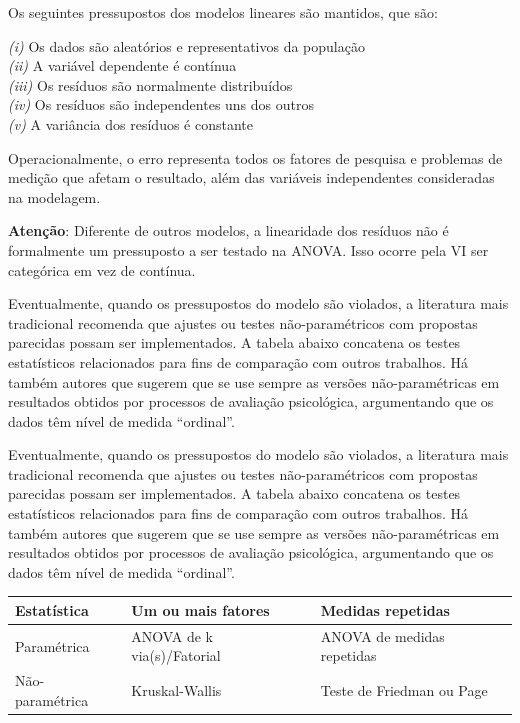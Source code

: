 \documentclass[
]{book}
\begin{document}
Os seguintes pressupostos dos modelos lineares são mantidos, que são:

\emph{(i)} Os dados são aleatórios e representativos da população\\
\emph{(ii)} A variável dependente é contínua\\
\emph{(iii)} Os resíduos são normalmente distribuídos\\
\emph{(iv)} Os resíduos são independentes uns dos outros\\
\emph{(v)} A variância dos resíduos é constante

Operacionalmente, o erro representa todos os fatores de pesquisa e problemas de medição que afetam o resultado, além das variáveis independentes consideradas na modelagem.

\textbf{Atenção}: Diferente de outros modelos, a linearidade dos resíduos não é formalmente um pressuposto a ser testado na ANOVA. Isso ocorre pela VI ser categórica em vez de contínua.

Eventualmente, quando os pressupostos do modelo são violados, a literatura mais tradicional recomenda que ajustes ou testes não-paramétricos com propostas parecidas possam ser implementados. A tabela abaixo concatena os testes estatísticos relacionados para fins de comparação com outros trabalhos. Há também autores que sugerem que se use sempre as versões não-paramétricas em resultados obtidos por processos de avaliação psicológica, argumentando que os dados têm nível de medida ``ordinal''.

Eventualmente, quando os pressupostos do modelo são violados, a literatura mais tradicional recomenda que ajustes ou testes não-paramétricos com propostas parecidas possam ser implementados. A tabela abaixo concatena os testes estatísticos relacionados para fins de comparação com outros trabalhos. Há também autores que sugerem que se use sempre as versões não-paramétricas em resultados obtidos por processos de avaliação psicológica, argumentando que os dados têm nível de medida ``ordinal''.

\begin{longtable}[]{@{}lll@{}}
\toprule
Estatística & Um ou mais fatores & Medidas repetidas \\
\midrule
\endhead
Paramétrica & ANOVA de k via(s)/Fatorial & ANOVA de medidas repetidas \\
Não-paramétrica & Kruskal-Wallis & Teste de Friedman ou Page \\
\bottomrule
\end{longtable}
\end{document}
